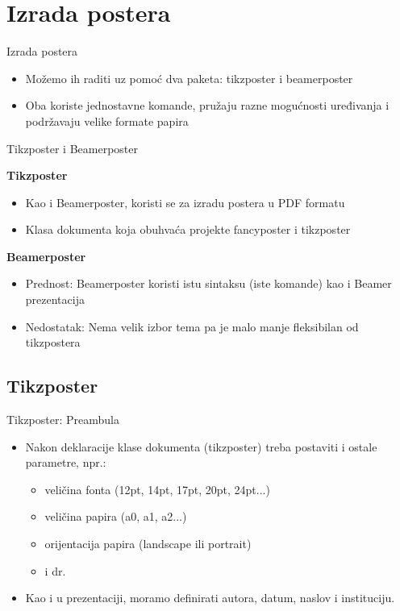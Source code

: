\documentclass{beamer}
\begin{document}
\section{Izrada postera}

\begin{frame}{Izrada postera}

    \begin{itemize}
        \item Možemo ih raditi uz pomoć dva paketa: tikzposter i beamerposter
        \item Oba koriste jednostavne komande, pružaju razne mogućnosti uređivanja i podržavaju velike formate papira
    \end{itemize}
    

    
\end{frame}
    
\begin{frame}{Tikzposter i Beamerposter}
    
    \textbf{Tikzposter}
    \begin{itemize}
        \item Kao i Beamerposter, koristi se za izradu postera u PDF formatu
        \item Klasa dokumenta koja obuhvaća projekte fancyposter i tikzposter
    \end{itemize}
    
 \textbf{Beamerposter}
\begin{itemize}
    \item Prednost: Beamerposter koristi istu sintaksu (iste komande) kao i Beamer prezentacija
    \item Nedostatak: Nema velik izbor tema pa je malo manje fleksibilan od tikzpostera
    \
\end{itemize}
    
\end{frame}


\subsection{Tikzposter}
\begin{frame}{Tikzposter: Preambula}

\begin{itemize}
    \item Nakon deklaracije klase dokumenta (tikzposter) treba postaviti i ostale parametre, npr.:
    \begin{itemize}
        \item veličina fonta (12pt, 14pt, 17pt, 20pt, 24pt...)
        \item veličina papira (a0, a1, a2...)
        \item orijentacija papira (landscape ili portrait)
        \item i dr.
    \end{itemize}
   \item  Kao i u prezentaciji, moramo definirati autora, datum, naslov i instituciju.

\end{itemize}

\end{frame}
\end{document}
